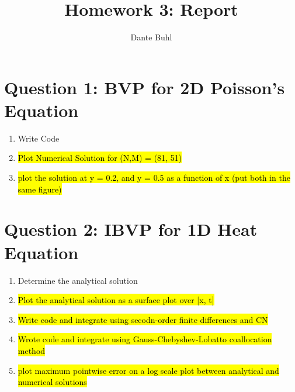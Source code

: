 \documentclass{article}
\title{Homework 3: Report}
\author{Dante Buhl}
\begin{document}
\newcommand{\bs}[1]{\boldsymbol{#1}}
\newcommand{\bmp}[1]{\begin{minipage}{#1\textwidth}}
\newcommand{\emp}{\end{minipage}}
\newcommand{\R}{\mathbb{R}}
\newcommand{\C}{\mathbb{C}}
\newcommand{\N}{\mathcal{N}}
\newcommand{\I}{\mathrm{I}}
\newcommand{\K}{\bs{\mathrm{K}}}
\newcommand{\m}{\bs{\mu}_*}
\newcommand{\s}{\bs{\Sigma}_*}
\newcommand{\dt}{\Delta t}
\newcommand{\tr}[1]{\text{Tr}(#1)}
\newcommand{\Tr}[1]{\text{Tr}(#1)}

\maketitle

\section*{Question 1: BVP for 2D Poisson's Equation}
\begin{enumerate}[label=\alph*)]

    \item Write Code

    \item \hl{Plot Numerical Solution for (N,M) = (81, 51)}

    \item \hl{plot the solution at y = 0.2, and y = 0.5 as a function of x (put both
    in the same figure)}

\end{enumerate}


\section*{Question 2: IBVP for 1D Heat Equation}

\begin{enumerate}[label=\alph*)]

    \item Determine the analytical solution 

    \item \hl{Plot the analytical solution as a surface plot over [x, t]}

    \item \hl{Write code and integrate using secodn-order finite differences and CN}

    \item \hl{Wrote code and integrate using Gauss-Chebyshev-Lobatto coallocation
    method}

    \item \hl{plot maximum pointwise error on a log scale plot between analytical
    and numerical solutions}

\end{enumerate}
\end{document}
